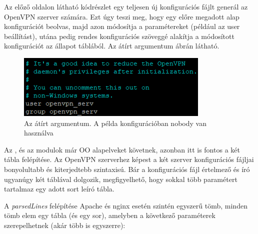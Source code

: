 Az előző oldalon látható kódrészlet egy teljesen új konfigurációs fájlt generál az OpenVPN szerver számára. Ezt úgy teszi meg, hogy egy előre megadott alap konfigurációt beolvas, majd azon módosítja a paramétereket (például az user beállítást), utána pedig rendes konfigurációs szöveggé alakítja a módosított konfigurációt az állapot táblából. Az átírt argumentum  ábrán látható.

\begin{figure}[h]
\centering
\includegraphics[scale=1.0]{images/openvpn_config_edit_example.png}
\caption{Az átírt  argumentum. A példa konfigurációban nobody van használva}
\label{fig:openvpn_config_edit_example}
\end{figure}


Az \textit{}, és az \textit{} modulok már OO alapelveket követnek, azonban itt is fontos a két tábla felépítése. Az OpenVPN szerverhez képest a két szerver konfigurációs fájljai bonyolultabb és kiterjedtebb szintaxisú. Bár a konfigurációs fájl értelmező és író ugyanúgy két táblával dolgozik, megfigyelhető, hogy sokkal több paramétert tartalmaz egy adott sort leíró tábla.

A \textit{parsedLines} felépítése Apache és nginx esetén szintén egyszerű tömb, minden tömb elem egy tábla (és egy sor), amelyben a következő paraméterek szerepelhetnek (akár több is egyszerre):

